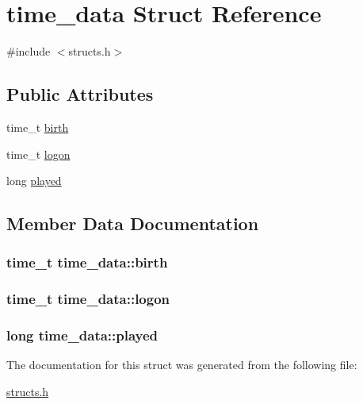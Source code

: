 \hypertarget{structtime__data}{\section{time\-\_\-data Struct Reference}
\label{structtime__data}
}


{\ttfamily \#include $<$structs.\-h$>$}

\subsection*{Public Attributes}
\begin{DoxyCompactItemize}
\item 
time\-\_\-t \hyperlink{structtime__data_a335b9731cbcfad50a9492f732cd62d64}{birth}
\item 
time\-\_\-t \hyperlink{structtime__data_a74a114e6be3ccb5a8852ae8b7e19e995}{logon}
\item 
long \hyperlink{structtime__data_a8fb1c887d95048ba19a8081470ba490c}{played}
\end{DoxyCompactItemize}


\subsection{Member Data Documentation}
\hypertarget{structtime__data_a335b9731cbcfad50a9492f732cd62d64}{
\subsubsection[{birth}]{\setlength{\rightskip}{0pt plus 5cm}time\-\_\-t time\-\_\-data\-::birth}}\label{structtime__data_a335b9731cbcfad50a9492f732cd62d64}
\hypertarget{structtime__data_a74a114e6be3ccb5a8852ae8b7e19e995}{
\subsubsection[{logon}]{\setlength{\rightskip}{0pt plus 5cm}time\-\_\-t time\-\_\-data\-::logon}}\label{structtime__data_a74a114e6be3ccb5a8852ae8b7e19e995}
\hypertarget{structtime__data_a8fb1c887d95048ba19a8081470ba490c}{
\subsubsection[{played}]{\setlength{\rightskip}{0pt plus 5cm}long time\-\_\-data\-::played}}\label{structtime__data_a8fb1c887d95048ba19a8081470ba490c}


The documentation for this struct was generated from the following file\-:\begin{DoxyCompactItemize}
\item 
\hyperlink{structs_8h}{structs.\-h}\end{DoxyCompactItemize}
